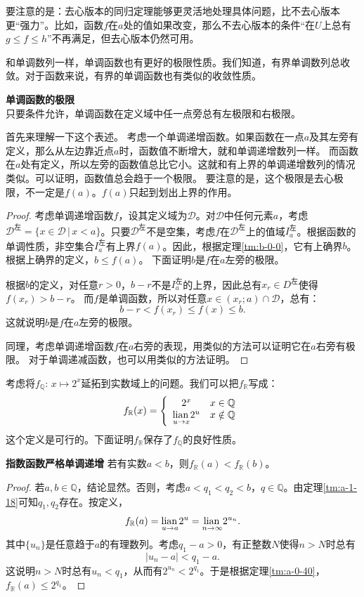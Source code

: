\documentclass[12pt,UTF8,fontset=none]{ctexbook}
\begin{document}
\begin{appendix}
要注意的是：去心版本的同归定理能够更灵活地处理具体问题，比不去心版本更“强力”。比如，函数$f$在$a$处的值如果改变，那么不去心版本的条件“在$U$上总有$g \leqslant f \leqslant h $”不再满足，但去心版本仍然可用。

和单调数列一样，单调函数也有更好的极限性质。我们知道，有界单调数列总收敛。对于函数来说，有界的单调函数也有类似的收敛性质。
\begin{tm}{\textbf{单调函数的极限}}\label{tm:b-0-30}\\
    只要条件允许，单调函数在定义域中任一点旁总有左极限和右极限。
\end{tm}
首先来理解一下这个表述。
考虑一个单调递增函数。如果函数在一点$a$及其左旁有定义，那么从左边靠近点$a$时，函数值不断增大，就和单调递增数列一样。
而函数在$a$处有定义，所以左旁的函数值总比它小。这就和有上界的单调递增数列的情况类似。可以证明，函数值总会趋于一个极限。
要注意的是，这个极限是去心极限，不一定是$f(a)$。$f(a)$只起到划出上界的作用。
\begin{proof}
    考虑单调递增函数$f$，设其定义域为$\mathcal{D}$。对$\mathcal{D}$中任何元素$a$，考虑$\mathcal{D}^{\text{左}} = \{x\in\mathcal{D} \, | \, x < a\}$。只要$\mathcal{D}^{\text{左}}$不是空集，考虑$f$在$\mathcal{D}^{\text{左}}$上的值域$I_a^{\text{左}}$。根据函数的单调性质，非空集合$I_a^{\text{左}}$有上界$f(a)$。因此，根据定理\ref{tm:b-0-0}，它有上确界$b$。根据上确界的定义，$b\leqslant f(a)$。
    下面证明$b$是$f$在$a$左旁的极限。

    根据$b$的定义，对任意$r>0$，$b - r$不是$I_a^{\text{左}}$的上界，因此总有$x_r\in D^{\text{左}}$使得$f(x_r)>b-r$。
    而$f$是单调函数，所以对任意$x\in(x_r;a)\cap\mathcal{D}$，总有：
    $$ b - r < f(x_r) \leqslant f(x) \leqslant b.$$
    这就说明$b$是$f$在$a$左旁的极限。 

    同理，考虑单调递增函数$f$在$a$右旁的表现，用类似的方法可以证明它在$a$右旁有极限。
    对于单调递减函数，也可以用类似的方法证明。
\end{proof}

考虑将$f_{\mathbb{Q}}:\,x\mapsto 2^x$延拓到实数域上的问题。我们可以把$f_{\mathbb{R}}$写成：
$$
    f_{\mathbb{R}} (x) = \left\{\begin{array}[]{cc}
        2^x & x\in\mathbb{Q} \\
        \lian{u \to x} 2^u & x \notin \mathbb{Q}
    \end{array}\right.
$$
这个定义是可行的。下面证明$f_{\mathbb{R}}$保存了$f_{\mathbb{Q}}$的良好性质。

\begin{tm}{\textbf{指数函数严格单调递增}}
    若有实数$a<b$，则$f_{\mathbb{R}} (a) < f_{\mathbb{R}}(b)$。
\end{tm}
\begin{proof}
    若$a,b\in\mathbb{Q}$，结论显然。否则，考虑$a<q_1<q_2<b$，$q\in\mathbb{Q}$。由定理\ref{tm:a-1-18}可知$q_1,q_2$存在。按定义，
    $$ f_{\mathbb{R}} (a) = \underset{u \to a}{\operatorname{lian}\,} 2^u = \underset{n\to\infty}{\operatorname{lian}\,} 2^{u_n}. $$
    其中$\{u_n\}$是任意趋于$a$的有理数列。考虑$q_1-a>0$，有正整数$N$使得$n>N$时总有
    $$ |u_n - a| < q_1 - a.$$
    这说明$n>N$时总有$u_n < q_1$，从而有$2^{u_n} < 2^{q_1}$。于是根据定理\ref{tm:a-0-40}，$f_{\mathbb{R}} (a)\leqslant 2^{q_1}$。


\end{proof}
\end{appendix}
\end{document}

